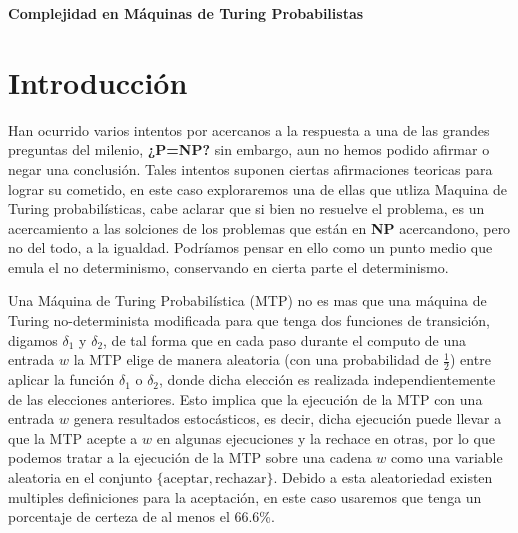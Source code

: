 \documentclass[12pt,letterpaper]{article}
\begin{document}
\begin{center}
    \textbf{{\Large Complejidad en Máquinas de Turing Probabilistas}}
\end{center}
\section*{Introducción}

Han ocurrido varios intentos por acercanos a la respuesta a una de las grandes preguntas del milenio, \textbf{¿P=NP?} sin embargo, aun no hemos podido afirmar o negar una conclusión. Tales intentos suponen ciertas afirmaciones teoricas para lograr su cometido, en este caso exploraremos una de ellas que utliza Maquina de Turing probabilísticas, cabe aclarar que si bien no resuelve el problema, es un acercamiento a las solciones de los problemas que están en \textbf{NP} acercandono, pero no del todo, a la igualdad. Podríamos pensar en ello como un punto medio que emula el no determinismo, conservando en cierta parte el determinismo.

Una Máquina de Turing Probabilística (MTP) no es mas que una máquina de Turing no-determinista 
modificada para que tenga dos funciones de transición, digamos $\delta_1$ y $\delta_2$, 
de tal forma que en cada paso durante el computo de una entrada $w$ la MTP elige de 
manera aleatoria (con una probabilidad de $\frac{1}{2}$) entre aplicar la función $\delta_1$ 
o $\delta_2$, donde dicha elección es realizada independientemente de las 
elecciones anteriores. Esto implica que la ejecución de la MTP con una entrada $w$ 
genera resultados estocásticos, es decir, dicha ejecución puede llevar a que la MTP 
acepte a $w$ en algunas ejecuciones y la rechace en otras, por lo que podemos tratar 
a la ejecución de la MTP sobre una cadena $w$ como una variable aleatoria en el 
conjunto $\{\text{aceptar}, \text{rechazar}\}$. Debido a esta aleatoriedad existen multiples definiciones para la aceptación, en este caso usaremos que tenga un porcentaje de certeza de al menos el 66.6\%. %
\end{document}
